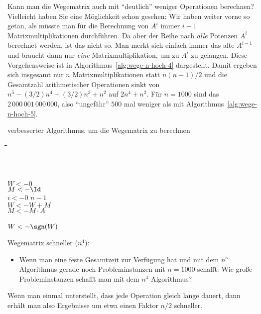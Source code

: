 Kann man die Wegematrix auch mit "`deutlich"' weniger Operationen
berechnen? Vielleicht haben Sie eine Möglichkeit schon gesehen: Wir
haben weiter vorne so getan, als müsste man für die Berechnung von
$A^i$ immer $i-1$ Matrixmultiplikationen durchführen. Da aber der
Reihe nach \emph{alle} Potenzen $A^i$ berechnet werden, ist das nicht
so. Man merkt sich einfach immer das alte $A^{i-1}$ und braucht dann
nur \emph{eine} Matrixmultiplikation, um zu $A^i$ zu gelangen.  Diese
Vorgehensweise ist in Algorithmus~\ref{alg:wege-n-hoch-4}
dargestellt. Damit ergeben sich insgesamt nur $n$
Matrixmultiplikationen statt $n(n-1)/2$ und die Gesamtzahl
arithmetischer Operationen sinkt von $n^5 -(3/2)n^4+(3/2)n^3+n^2$ auf
$2n^4+n^2$. Für $n=1000$ sind das $2\,000\,001\,000\,000$, also
"`ungefähr"' $500$ mal weniger als mit
Algorithmus~\ref{alg:wege-n-hoch-5}.
%
\begin{algorithm}[h]
  \caption{verbesserter Algorithmus, um die Wegematrix zu berechnen}
  \label{alg:wege-n-hoch-4}
  \vspace*{-\baselineskip}
  \begin{tabbing}
    \quad\=\quad\=\quad\=\quad\=\quad\=\hspace*{30mm}\=\\ \kill
    \>  \\
    \>  \\
    \>  \\
    \> $W <- 0$ \>\>\>\>\>  \\
    \> $M <- \Id$ \>\>\>\>\>   \\
    \> $i <- 0$  $n-1$ \\
    \>\> $W<-W+M$ \>\>\>\>   \\
    \>\> $M <- M \cdot A$  \>\>\>\>   \\
    \> \\  
    \> $W <- \sgn(W)$ \\
  \end{tabbing}
  \vspace*{-\baselineskip}
\end{algorithm}

\begin{tutorium}
  Wegematrix schneller ($n^4$):
  \begin{itemize}
  \item Wenn man eine feste Gesamtzeit zur Verfügung hat und mit dem
    $n^5$ Algorithmus gerade noch Probleminstanzen mit $n=1000$
    schafft: Wie große Probleminstanzen schafft man mit dem $n^4$ Algorithmus?
  \end{itemize}
\end{tutorium}
%
Wenn man einmal unterstellt, dass jede Operation gleich lange dauert,
dann erhält man also Ergebnisse um etwa einen Faktor $n/2$ schneller.

